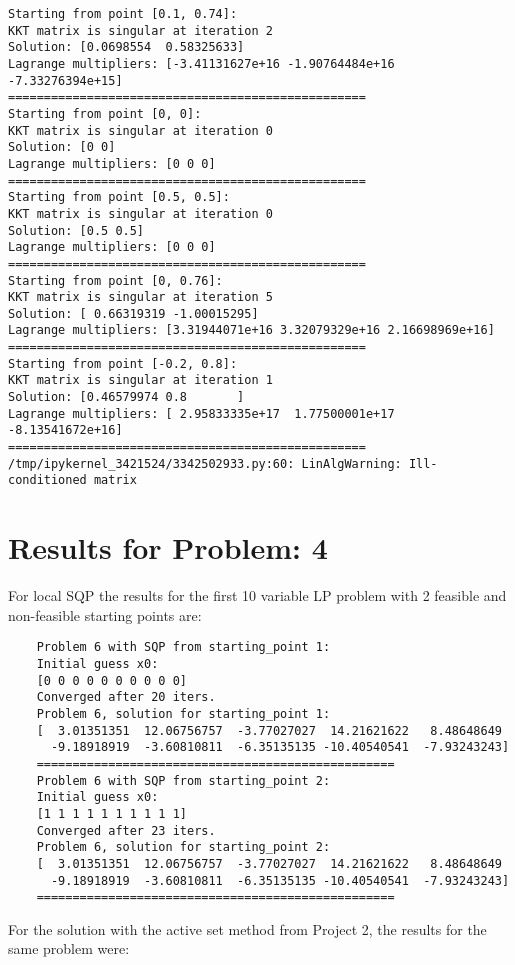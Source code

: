\documentclass{article}
\begin{document}
\begin{verbatim}
Starting from point [0.1, 0.74]:
KKT matrix is singular at iteration 2
Solution: [0.0698554  0.58325633]
Lagrange multipliers: [-3.41131627e+16 -1.90764484e+16 -7.33276394e+15]
==================================================
Starting from point [0, 0]:
KKT matrix is singular at iteration 0
Solution: [0 0]
Lagrange multipliers: [0 0 0]
==================================================
Starting from point [0.5, 0.5]:
KKT matrix is singular at iteration 0
Solution: [0.5 0.5]
Lagrange multipliers: [0 0 0]
==================================================
Starting from point [0, 0.76]:
KKT matrix is singular at iteration 5
Solution: [ 0.66319319 -1.00015295]
Lagrange multipliers: [3.31944071e+16 3.32079329e+16 2.16698969e+16]
==================================================
Starting from point [-0.2, 0.8]:
KKT matrix is singular at iteration 1
Solution: [0.46579974 0.8       ]
Lagrange multipliers: [ 2.95833335e+17  1.77500001e+17 -8.13541672e+16]
==================================================
/tmp/ipykernel_3421524/3342502933.py:60: LinAlgWarning: Ill-conditioned matrix
\end{verbatim}

\section*{Results for Problem: 4}

For local SQP the results for the first 10 variable LP problem with 2 feasible and non-feasible starting points are:

\begin{verbatim}
    Problem 6 with SQP from starting_point 1:
    Initial guess x0:
    [0 0 0 0 0 0 0 0 0 0]
    Converged after 20 iters.
    Problem 6, solution for starting_point 1: 
    [  3.01351351  12.06756757  -3.77027027  14.21621622   8.48648649
      -9.18918919  -3.60810811  -6.35135135 -10.40540541  -7.93243243]
    ==================================================
    Problem 6 with SQP from starting_point 2:
    Initial guess x0:
    [1 1 1 1 1 1 1 1 1 1]
    Converged after 23 iters.
    Problem 6, solution for starting_point 2: 
    [  3.01351351  12.06756757  -3.77027027  14.21621622   8.48648649
      -9.18918919  -3.60810811  -6.35135135 -10.40540541  -7.93243243]
    ==================================================
\end{verbatim}

For the solution with the active set method from Project 2, the results for the same problem were:
\end{document}
